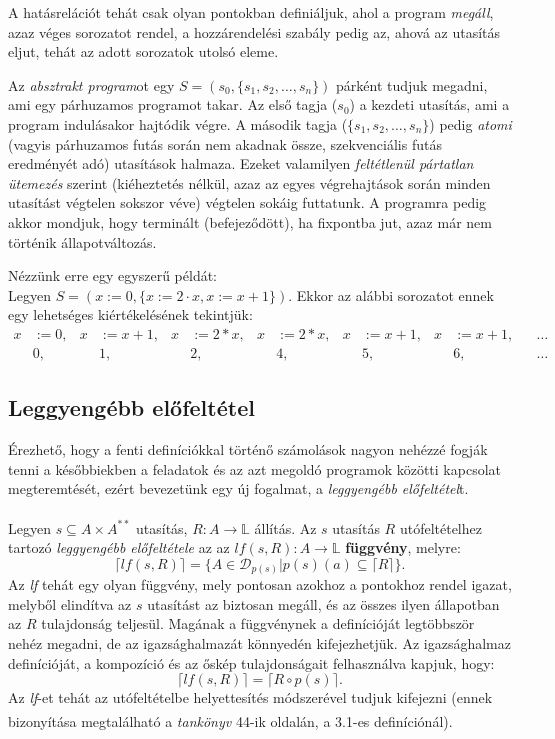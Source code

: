 \documentclass[12pt]{article}
\newcommand{\sut}{$s \subseteq A \times A^{**}$ }
\newcommand{\sprog}{$S = (s_0, \{s_1, s_2, \dots, s_n\})$ }
\begin{document}
A hatásrelációt tehát csak olyan pontokban definiáljuk, ahol a program \textit{megáll}, azaz véges sorozatot rendel, a hozzárendelési szabály pedig az, ahová az utasítás eljut, tehát az adott sorozatok utolsó eleme.


Az \textit{absztrakt program}ot egy \sprog párként tudjuk megadni, ami egy párhuzamos programot takar. Az első tagja ($s_0$) a kezdeti utasítás, ami a program indulásakor hajtódik végre. A második tagja ($\{s_1, s_2, \dots, s_n\}$) pedig \textit{atomi} (vagyis párhuzamos futás során nem akadnak össze, szekvenciális futás eredményét adó) utasítások halmaza. Ezeket valamilyen \textit{feltétlenül pártatlan ütemezés} szerint (kiéheztetés nélkül, azaz az egyes végrehajtások során minden utasítást végtelen sokszor véve) végtelen sokáig futtatunk. A programra pedig akkor mondjuk, hogy terminált (befejeződött), ha fixpontba jut, azaz már nem történik állapotváltozás.

Nézzünk erre egy egyszerű példát:\\
Legyen $S = (x := 0, \{x := 2 \cdot x, x := x + 1\})$. Ekkor az alábbi sorozatot ennek egy lehetséges kiértékelésének tekintjük:
\begin{align*}
	x &:= 0,	&x &:= x + 1,	&x &:= 2*x,	&x &:= 2*x,	&x &:= x + 1,	&x &:= x + 1,	&&\dots\\
	&0,	&&1,	&&2,	&&4, &&5,	&&6,	&&\dots
\end{align*}


\subsection{Leggyengébb előfeltétel}
Érezhető, hogy a fenti definíciókkal történő számolások nagyon nehézzé fogják tenni a későbbiekben a feladatok és az azt megoldó programok közötti kapcsolat megteremtését, ezért bevezetünk egy új fogalmat, a \textit{leggyengébb előfeltétel}t.
\paragraph{}
Legyen \sut utasítás, $R: A \rightarrow \mathbb{L}$ állítás. Az $s$ utasítás $R$ utófeltételhez tartozó \textit{leggyengébb előfeltétele} az az $lf(s,R): A \rightarrow \mathbb{L}$ \textbf{függvény}, melyre:
$$ \lceil lf(s,R) \rceil = \{ A \in \mathcal{D}_{p(s)} | p(s)(a) \subseteq \lceil R \rceil \}. $$
Az \textit{lf} tehát egy olyan függvény, mely pontosan azokhoz a pontokhoz rendel igazat, melyből elindítva az $s$ utasítást az biztosan megáll, és az összes ilyen állapotban az $R$ tulajdonság teljesül. Magának a függvénynek a definícióját legtöbbször nehéz megadni, de az igazsághalmazát könnyedén kifejezhetjük. Az igazsághalmaz definícióját, a kompozíció és az őskép tulajdonságait felhasználva kapjuk, hogy:
$$\lceil lf(s,R)\rceil = \lceil R \circ p(s) \rceil.$$
Az \textit{lf}-et tehát az utófeltételbe helyettesítés módszerével tudjuk kifejezni (ennek bizonyítása megtalálható a \textit{tankönyv}\textsuperscript{\cite{fothi_biblia}} 44-ik oldalán, a 3.1-es definíciónál). 
\end{document}
